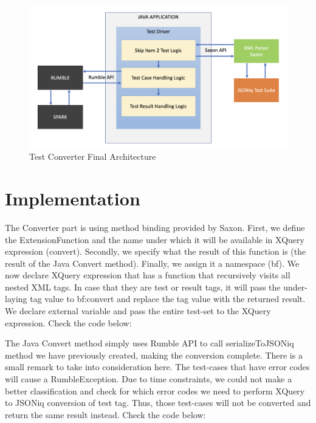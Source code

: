 \begin{figure}[h!]
	\vspace*{-5mm}
	\includegraphics[width=\linewidth]{test_driver_final_architecture.png}
	\vspace*{-8mm}
	\caption{Test Converter Final Architecture}
	\label{fig:test_driver_final_architecture.png}
\end{figure}

\section{Implementation}
The Converter part is using method binding provided by Saxon. First, we define the ExtensionFunction and the name under which it will be available in XQuery expression (convert). Secondly, we specify what the result of this function is (the result of the Java Convert method). Finally, we assign it a namespace (bf). We now declare XQuery expression that has a function that recursively visits all nested XML tags. In case that they are test or result tags, it will pass the under-laying tag value to bf:convert and replace the tag value with the returned result. We declare external variable and pass the entire test-set to the XQuery expression. Check the code below:



The Java Convert method simply uses Rumble API to call serializeToJSONiq method we have previously created, making the conversion complete. There is a small remark to take into consideration here. The test-cases that have error codes will cause a RumbleException. Due to time constraints, we could not make a better classification and check for which error codes we need to perform XQuery to JSONiq conversion of test tag. Thus, those test-cases will not be converted and return the same result instead. Check the code below:

